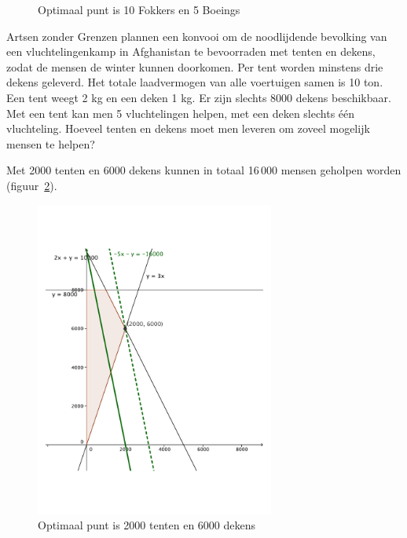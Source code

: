 \begin{oef}
\begin{opl}
\begin{figure}[hbtp]
\caption{Optimaal punt is 10 Fokkers en 5 Boeings}
\label{fig:deptjaar}
\end{figure}
\clearpage
\end{opl}
\end{oef}      

\begin{oef}
Artsen zonder Grenzen plannen een konvooi om de
noodlijdende bevolking van een vluchtelingenkamp in Afghanistan te 
bevoorraden met tenten en dekens, zodat de mensen de winter kunnen 
doorkomen. Per tent worden minstens drie dekens geleverd. Het totale laadvermogen van alle voertuigen samen is 
10 ton. Een tent weegt 2 kg en een deken 1 kg. Er zijn slechts 8000 dekens beschikbaar. Met een tent kan men 
5 vluchtelingen helpen, met een deken slechts \'{e}\'{e}n 
vluchteling. Hoeveel tenten en dekens moet men leveren om zoveel 
mogelijk mensen te helpen? 
\begin{opl}
Met 2000 tenten en 6000 dekens kunnen in totaal 16\,000 mensen geholpen worden (figuur~\ref{fig:AZG}).
\begin{figure}[hbtp]
  \centering
  \includegraphics[width=0.7\textwidth]{oefeningen/FigurenLP/OefAZG.pdf}
  \caption{Optimaal punt is 2000 tenten en 6000 dekens}
  \label{fig:AZG}
\end{figure}
\end{opl}
\end{oef}
     
